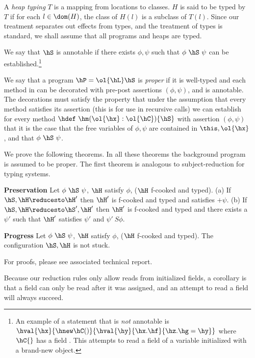 A {\em heap typing} $T$ is a mapping from locations to classes. $H$ is
said to be typed by $T$ if for each $l\in\dom(H)$, the class of $H(l)$
is a subclass of $T(l)$.  Since our treatment separates out effects
from types, and the treatment of types is standard, we shall assume
that all programs and heaps are typed.

We say that $\hS$ is annotable if there exists $\phi,\psi$ such that
$\phi~\hS~\psi$ can be established.\footnote{An example of a statement that is
{\em not} annotable is $\hval{\hx}{\hnew
  \hC()}{\hval{\hy}{\hx.\hf}{\hz.\hg=\hy}}$ where $\hC{}$ has a field
\hf. This attempts to read a field of a variable initialized with a
brand-new object.}

We say that a program $\hP=\ol{\hL}\hS$ is {\em proper} if it is
well-typed and each method in \hL{} can be decorated with pre-post assertions
$(\phi,\psi)$, and \hS is annotable.
The decorations must satisfy the property that under the
assumption that every method satisfies its assertion (this is for use
in recursive calls) we can establish for every method
$\hdef~\hm(\ol{\hx}:\ol{\hC})\{\hS\}$ with assertion $(\phi,\psi)$ that
it is the case that the free variables of $\phi,\psi$ are contained in
$\this,\ol{\hx}$, and that $\phi~\hS~\psi$.

We prove the following theorems. In all these theorems the background
program \hP{} is assumed to be proper. The first theorem is analogous
to subject-reduction for typing systems.
\begin{Theorem}{\textbf{Preservation}}
Let $\phi~\hS~\psi$, $\hH$ satisfy $\phi$, ($\hH$ f-cooked and typed).
(a) If $\hS,\hH \reducesto \hH'$ then $\hH'$ is f-cooked and typed and satisfies $+\psi$.
(b) If $\hS,\hH \reducesto \hS',\hH'$ then $\hH'$ is f-cooked and typed and
there exists a $\psi'$ such
that $\hH'$ satisfies $\psi'$ and $\psi'~S\phi$.
\end{Theorem}

\begin{Theorem}{\textbf{Progress}}
 Let $\phi~\hS~\psi$, $\hH$ satisfy $\phi$, ($\hH$ f-cooked and
 typed). The configuration $\hS,\hH$ is not stuck.
\end{Theorem}

For proofs, please see associated technical report.

Because our reduction rules only allow reads from initialized fields,
a corollary is that a field can only be read after it was assigned,
and an attempt to read a field will always succeed.
